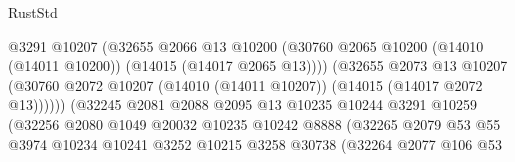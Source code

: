\begin{lexlean}{RustStd}
\begin{coremodule}
                                          @3291
                                          @10207
                                          (@32655
                                            @2066
                                            @13
                                            @10200
                                            (@30760
                                              @2065
                                              @10200
                                              (@14010 (@14011 @10200))
                                              (@14015 (@14017 @2065 @13))))
                                          (@32655
                                            @2073
                                            @13
                                            @10207
                                            (@30760
                                              @2072
                                              @10207
                                              (@14010 (@14011 @10207))
                                              (@14015 (@14017 @2072 @13))))))
                                      (@32245
                                        @2081
                                        @2088
                                        @2095
                                        @13
                                        @10235
                                        @10244
                                        @3291
                                        @10259
                                        (@32256
                                          @2080
                                          @1049
                                          @20032
                                          @10235
                                          @10242
                                          @8888
                                          (@32265
                                            @2079
                                            @53
                                            @55
                                            @3974
                                            @10234
                                            @10241
                                            @3252
                                            @10215
                                            @3258
                                            @30738
                                            (@32264
                                              @2077
                                              @106
                                              @53

\end{coremodule}
\end{lexlean}

